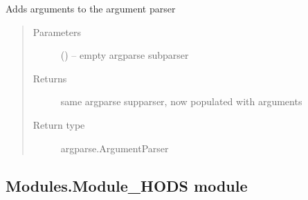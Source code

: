 \documentclass[letterpaper,10pt,english]{sphinxmanual}
\begin{document}
\begin{fulllineitems}
\label{\detokenize{MouseReferenceManual:Modules.Module_ABAQUS.populateArgumentParser}}
Adds arguments to the argument parser
\begin{quote}\begin{description}
\item[{Parameters}] \leavevmode
{} () -- empty argparse subparser

\item[{Returns}] \leavevmode
same argparse supparser, now populated with arguments

\item[{Return type}] \leavevmode
argparse.ArgumentParser

\end{description}\end{quote}

\end{fulllineitems}



\subsection{Modules.Module\_HODS module}
\label{\detokenize{MouseReferenceManual:modules-module-hods-module}}\label{\detokenize{MouseReferenceManual:module-Modules.Module_HODS}}
\end{document}
